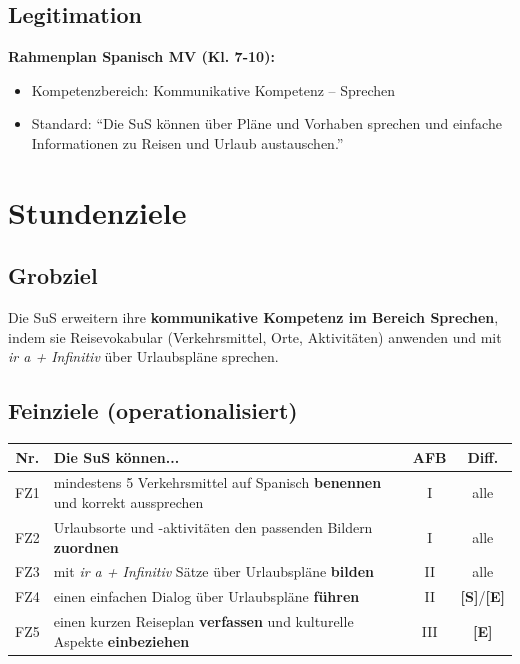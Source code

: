 \documentclass[11pt,a4paper]{article}
\newcommand{\Std}{\textcolor{standard}{\textbf{[S]}}}
\newcommand{\E}{\textcolor{erweiterung}{\textbf{[E]}}}
\begin{document}
\subsection{Legitimation}
\textbf{Rahmenplan Spanisch MV (Kl. 7-10):}
\begin{itemize}
    \item Kompetenzbereich: Kommunikative Kompetenz -- Sprechen
    \item Standard: ``Die SuS können über Pläne und Vorhaben sprechen und einfache Informationen zu Reisen und Urlaub austauschen.''
\end{itemize}

\section{Stundenziele}

\subsection{Grobziel}
Die SuS erweitern ihre \textbf{kommunikative Kompetenz im Bereich Sprechen}, indem sie Reisevokabular (Verkehrsmittel, Orte, Aktivitäten) anwenden und mit \textit{ir a + Infinitiv} über Urlaubspläne sprechen.

\subsection{Feinziele (operationalisiert)}
\begin{tabular}{|c|p{7.5cm}|c|c|}
\hline
\textbf{Nr.} & \textbf{Die SuS können...} & \textbf{AFB} & \textbf{Diff.} \\
\hline
FZ1 & mindestens 5 Verkehrsmittel auf Spanisch \textbf{benennen} und korrekt aussprechen & I & alle \\
\hline
FZ2 & Urlaubsorte und -aktivitäten den passenden Bildern \textbf{zuordnen} & I & alle \\
\hline
FZ3 & mit \textit{ir a + Infinitiv} Sätze über Urlaubspläne \textbf{bilden} & II & alle \\
\hline
FZ4 & einen einfachen Dialog über Urlaubspläne \textbf{führen} & II & \Std{}/\E{} \\
\hline
FZ5 & einen kurzen Reiseplan \textbf{verfassen} und kulturelle Aspekte \textbf{einbeziehen} & III & \E{} \\
\hline
\end{tabular}
\end{document}
